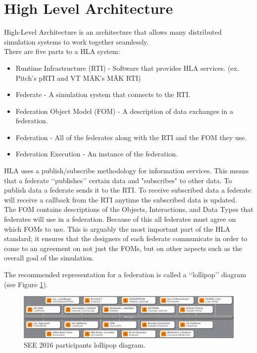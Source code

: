 \documentclass[journal, onecolumn]{IEEEtran}
\begin{document}
\section{High Level Architecture}
High-Level Architecture is an architecture that allows many distributed simulation systems to work together seamlessly. \\
		There are five parts to a HLA system:
		\begin{itemize}
			\item Runtime Infrastructure (RTI) - Software that provides HLA services. (ex. Pitch\rq{}s pRTI and VT M{\"A}K\rq{}s M{\"A}K RTI)
			\item Federate - A simulation system that connects to the RTI.
			\item Federation Object Model (FOM) - A description of data exchanges in a federation.
			\item Federation - All of the federates along with the RTI and the FOM they use.
			\item Federation Execution - An instance of the federation.
		\end{itemize}
HLA uses a publish/subscribe methodology for information services. This means that a federate \lq\lq{}publishes\rq\rq{} certain data and "subscribes" to other data. To publish data a federate sends it to the RTI. To receive subscribed data a federate will receive a callback from the RTI anytime the subscribed data is updated. \\
		
The FOM contains descriptions of the Objects, Interactions, and Data Types that federates will use in a federation. Because of this all federates must agree on which FOMs to use. This is arguably the most important part of the HLA standard; it ensures that the designers of each federate communicate in order to come to an agreement on not just the FOMs, but on other aspects such as the overall goal of the simulation.
		
The recommended representation for a federation is called a \lq\lq{}lollipop\rq\rq{} diagram (see Figure \ref{lollipop}). 
\begin{figure}[!htbp]
	\centering
		\includegraphics[width=\linewidth]{lollipop.png}
		\caption{SEE 2016 participants lollipop diagram.}
	\label{lollipop}
\end{figure}
\end{document}
